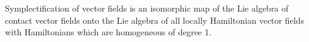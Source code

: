 Symplectification of vector fields is an isomorphic map of the Lie algebra of contact vector fields onto the Lie algebra of all locally Hamiltonian vector fields with Hamiltonians which are homogeneous of degree 1.
